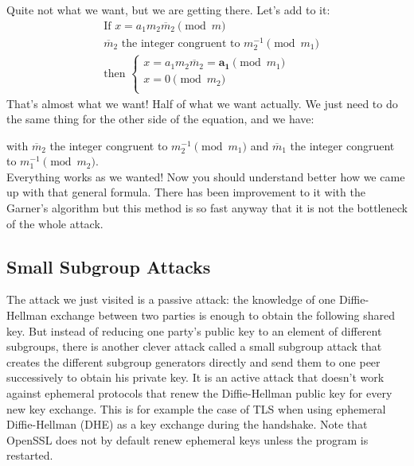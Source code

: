 \documentclass[a4paper,11pt,twocolumn]{article}
\begin{document}
Quite not what we want, but we are getting there. Let's add to it:
\begin{align*}
&\text{If } x = a_1  m_2 \overline{m}_2 \pmod{m}\\
&\overline{m}_2 \text{ the integer congruent to } m_2^{-1} \pmod{m_1}\\
&\text{then } \begin{cases}
    x = a_1 m_2 \overline{m}_2 = \boldsymbol{a_1} \pmod{m_1}\\
x = 0 \pmod{m_2}\\
\end{cases}
\end{align*}
That's almost what we want! Half of what we want actually. We just need to do the same thing for the other side of the equation, and we have:
\begin{center}\end{center}
with $\overline{m}_2$ the integer congruent to $m_2^{-1} \pmod{m_1}$ and $\overline{m}_1$ the integer congruent to $m_1^{-1} \pmod{m_2}$.\\

Everything works as we wanted! Now you should understand better how we came up with that general formula. There has been improvement to it with the Garner's algorithm but this method is so fast anyway that it is not the bottleneck of the whole attack.

\subsection{Small Subgroup Attacks}

The attack we just visited is a passive attack: the knowledge of one Diffie-Hellman exchange between two parties is enough to obtain the following shared key. But instead of reducing one party's public key to an element of different subgroups, there is another clever attack called a small subgroup attack that creates the different subgroup generators directly and send them to one peer successively to obtain his private key. It is an active attack that doesn't work against ephemeral protocols that renew the Diffie-Hellman public key for every new key exchange. This is for example the case of TLS when using ephemeral Diffie-Hellman (DHE) as a key exchange during the handshake. Note that OpenSSL does not by default renew ephemeral keys unless the program is restarted.
\end{document}

